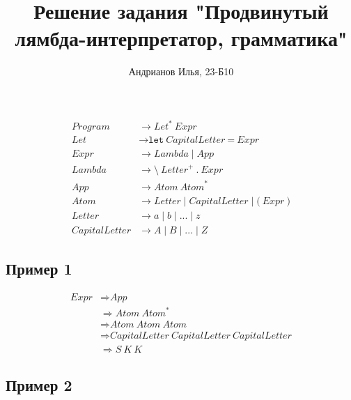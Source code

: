 \documentclass[a4paper,12pt]{article}
\title{Решение задания "Продвинутый лямбда-интерпретатор, грамматика"}
\author{Андрианов Илья, 23-Б10}
\begin{document}
\maketitle

\[
\begin{aligned}
\textit{Program} &\longrightarrow \textit{Let}^{*}\ \textit{Expr}\\[2mm]
\textit{Let} &\longrightarrow \texttt{let}\ \textit{CapitalLetter}\ \texttt{=}\ \textit{Expr}\\[2mm]
\textit{Expr} &\longrightarrow \textit{Lambda} \mid \textit{App}\\[2mm]
\textit{Lambda} &\longrightarrow \texttt{\textbackslash}\ \textit{Letter}^{+}\ \texttt{.}\ \textit{Expr}\\[2mm]
\textit{App} &\longrightarrow \textit{Atom}\ \textit{Atom}^{*}\\[2mm]
\textit{Atom} &\longrightarrow \textit{Letter} \mid \textit{CapitalLetter} \mid \texttt{(}\ \textit{Expr}\ \texttt{)}\\[2mm]
\textit{Letter} &\longrightarrow a \mid b \mid ... \mid z\\[2mm]
\textit{CapitalLetter} &\longrightarrow A \mid B \mid ... \mid Z
\end{aligned}
\]


\subsection*{Пример 1}

\[
\begin{aligned}
\textit{Expr}
&\Longrightarrow \textit{App}\\
&\Longrightarrow \textit{Atom}\ \textit{Atom}^{*}\\
&\Longrightarrow \textit{Atom}\ \textit{Atom}\ \textit{Atom}\\
&\Longrightarrow \textit{CapitalLetter}\ \textit{CapitalLetter}\ \textit{CapitalLetter}\\
&\Longrightarrow S\ K\ K
\end{aligned}
\]

\subsection*{Пример 2}
\end{document}
